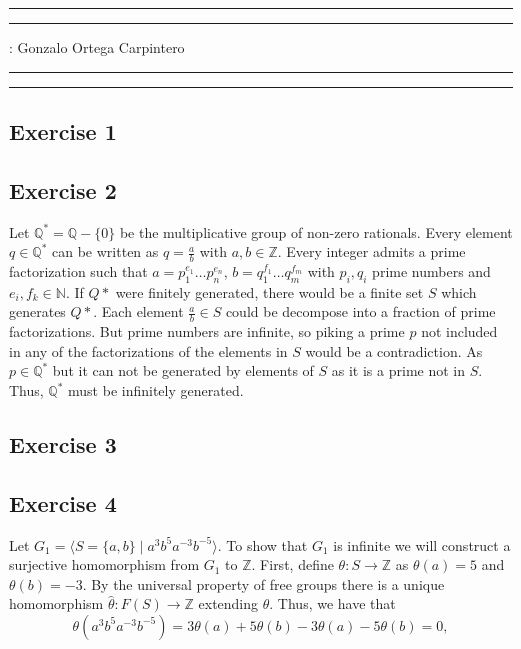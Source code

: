 \documentclass[11pt,a4paper]{article}
\newcommand{\Z}{\mathbb Z}
\newcommand{\Q}{\mathbb Q}
\newcommand{\N}{\mathbb N}
\begin{document}
\hrule\hrule
\vspace{1mm}


\vspace{1mm}

 : Gonzalo Ortega Carpintero
\vspace{2mm}

\hrule\hrule

\subsection*{Exercise 1}

\subsection*{Exercise 2}
Let $ \Q^* = \Q - \{0\} $ be the multiplicative group of non-zero rationals. Every element $ q \in \Q^* $ can be written as $ q = \frac{a}{b} $ with $ a, b \in \Z $. Every integer admits a prime factorization such that $ a = p_1^{e_1} \dots p_n^{e_n} $, $ b = q_1^{f_1} \dots q_m^{f_m} $ with $p_i, q_i $ prime numbers and $ e_i, f_k \in \N$. If $Q*$ were finitely generated, there would be a finite set $ S $ which generates $Q*$. Each element  $ \frac{a}{b} \in S $ could be decompose into a fraction of prime factorizations. But prime numbers are infinite, so piking a prime $ p $ not included in any of the factorizations of the elements in $ S $ would be a contradiction. As $ p \in \Q^*$ but it can not be generated by elements of $ S $ as it is a prime not in $ S $. Thus, $ \Q^*$ must be infinitely generated.

\subsection*{Exercise 3}

\subsection*{Exercise 4}
Let $ G_1 = \langle S = \{a, b\} \mid a^3 b^5 a^{-3} b^{-5} \rangle $. To show that $ G_1 $ is infinite we will construct a surjective homomorphism from $ G_1 $ to $ \Z $. First, define $ \theta \colon S \to \Z $ as  
$ \theta(a) = 5 $ and $ \theta(b) = -3 $. By the universal property of free groups there is a unique homomorphism $ \hat \theta \colon F(S) \to \Z $ extending $ \theta $. Thus, we have that
$$
  \theta (a^3 b^5 a^{-3} b^{-5}) = 3\theta(a) + 5\theta(b) - 3 \theta(a) - 5 \theta(b) = 0,
$$
\end{document}

